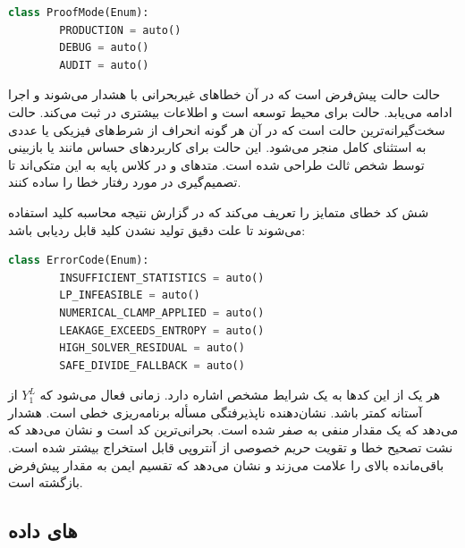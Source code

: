 \begin{LTR}
	\begin{lstlisting}[language=Python]
		class ProofMode(Enum):
		PRODUCTION = auto()
		DEBUG = auto()
		AUDIT = auto()
	\end{lstlisting}
\end{LTR}

حالت  حالت پیش‌فرض است که در آن خطاهای غیربحرانی با هشدار  می‌شوند و اجرا ادامه می‌یابد. حالت  برای محیط توسعه است و اطلاعات بیشتری در  ثبت می‌کند. حالت  سخت‌گیرانه‌ترین حالت است که در آن هر گونه انحراف از شرط‌های فیزیکی یا عددی به استثنای کامل منجر می‌شود. این حالت برای کاربردهای حساس مانند  یا بازبینی توسط شخص ثالث طراحی شده است. متدهای  و  در کلاس پایه به این  متکی‌اند تا تصمیم‌گیری در مورد رفتار خطا را ساده کنند.

 شش کد خطای متمایز را تعریف می‌کند که در گزارش نتیجه محاسبه کلید استفاده می‌شوند تا علت دقیق تولید نشدن کلید قابل ردیابی باشد:

\begin{LTR}
	\begin{lstlisting}[language=Python]
		class ErrorCode(Enum):
		INSUFFICIENT_STATISTICS = auto()
		LP_INFEASIBLE = auto()
		NUMERICAL_CLAMP_APPLIED = auto()
		LEAKAGE_EXCEEDS_ENTROPY = auto()
		HIGH_SOLVER_RESIDUAL = auto()
		SAFE_DIVIDE_FALLBACK = auto()
	\end{lstlisting}
\end{LTR}

هر یک از این کدها به یک شرایط مشخص اشاره دارد.  زمانی فعال می‌شود که $Y_1^L$ از آستانه  کمتر باشد.  نشان‌دهنده ناپذیرفتگی مسأله برنامه‌ریزی خطی است.  هشدار می‌دهد که یک مقدار منفی به صفر  شده است.  بحرانی‌ترین کد است و نشان می‌دهد که نشت تصحیح خطا و تقویت حریم خصوصی از آنتروپی قابل استخراج بیشتر شده است.  باقی‌مانده بالای  را علامت می‌زند و  نشان می‌دهد که تقسیم ایمن به مقدار پیش‌فرض بازگشته است.

\subsection{های داده}

\subsubsection{}

